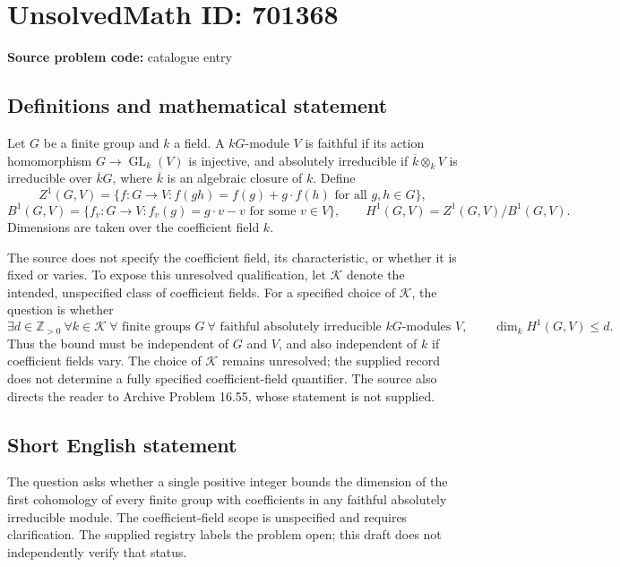\documentclass[11pt]{article}
\newcommand{\Z}{\mathbb{Z}}
\begin{document}
\section*{UnsolvedMath ID: 701368}
\textbf{Source problem code:} catalogue entry
\subsection{Definitions and mathematical statement}
Let \(G\) be a finite group and \(k\) a field. A \(kG\)-module \(V\) is faithful if its action homomorphism \(G\to\operatorname{GL}_k(V)\) is injective, and absolutely irreducible if \(\overline{k}\otimes_k V\) is irreducible over \(\overline{k}G\), where \(\overline{k}\) is an algebraic closure of \(k\). Define
\[
Z^1(G,V)=\{f:G\to V: f(gh)=f(g)+g\cdot f(h)\text{ for all }g,h\in G\},
\]
\[
B^1(G,V)=\{f_v:G\to V: f_v(g)=g\cdot v-v\text{ for some }v\in V\},
\qquad H^1(G,V)=Z^1(G,V)/B^1(G,V).
\]
Dimensions are taken over the coefficient field \(k\).

The source does not specify the coefficient field, its characteristic, or whether it is fixed or varies. To expose this unresolved qualification, let \(\mathcal K\) denote the intended, unspecified class of coefficient fields. For a specified choice of \(\mathcal K\), the question is whether
\[
\exists d\in\Z_{>0}\ \forall k\in\mathcal K\ \forall\text{ finite groups }G\ \forall\text{ faithful absolutely irreducible }kG\text{-modules }V,
\qquad \dim_k H^1(G,V)\le d.
\]
Thus the bound must be independent of \(G\) and \(V\), and also independent of \(k\) if coefficient fields vary. The choice of \(\mathcal K\) remains unresolved; the supplied record does not determine a fully specified coefficient-field quantifier. The source also directs the reader to Archive Problem 16.55, whose statement is not supplied.
\subsection{Short English statement}
The question asks whether a single positive integer bounds the dimension of the first cohomology of every finite group with coefficients in any faithful absolutely irreducible module. The coefficient-field scope is unspecified and requires clarification. The supplied registry labels the problem open; this draft does not independently verify that status.
\end{document}
